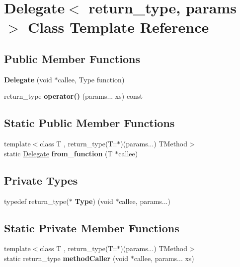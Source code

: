 \hypertarget{class_delegate}{}\section{Delegate$<$ return\+\_\+type, params $>$ Class Template Reference}
\label{class_delegate}
\subsection*{Public Member Functions}
\begin{DoxyCompactItemize}
\item 
\mbox{\label{class_delegate_a77fbd96d81a622da70a9cd278fa8a90e}} 
{\bfseries Delegate} (void $\ast$callee, Type function)
\item 
\mbox{\label{class_delegate_a3e82d4b647fddf4686c4d8c66f27708a}} 
return\+\_\+type {\bfseries operator()} (params... xs) const
\end{DoxyCompactItemize}
\subsection*{Static Public Member Functions}
\begin{DoxyCompactItemize}
\item 
\mbox{\label{class_delegate_aa116b260be972435ef89d480c7df8b09}} 
{\footnotesize template$<$class T , return\+\_\+type(\+T\+::$\ast$)(params...) T\+Method$>$ }\\static \hyperlink{class_delegate}{Delegate} {\bfseries from\+\_\+function} (T $\ast$callee)
\end{DoxyCompactItemize}
\subsection*{Private Types}
\begin{DoxyCompactItemize}
\item 
\mbox{\label{class_delegate_aa173a088403e41fdadeb32c4a14861f3}} 
typedef return\+\_\+type($\ast$ {\bfseries Type}) (void $\ast$callee, params...)
\end{DoxyCompactItemize}
\subsection*{Static Private Member Functions}
\begin{DoxyCompactItemize}
\item 
\mbox{\label{class_delegate_ace9d3fa55fab2c6b0766de9e3bbd1776}} 
{\footnotesize template$<$class T , return\+\_\+type(\+T\+::$\ast$)(params...) T\+Method$>$ }\\static return\+\_\+type {\bfseries method\+Caller} (void $\ast$callee, params... xs)
\end{DoxyCompactItemize}
